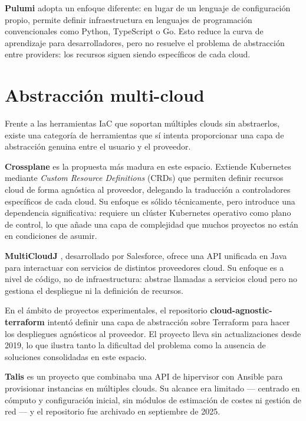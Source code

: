 \textbf{Pulumi} \cite{pulumiDocs} adopta un enfoque diferente: en lugar de un
lenguaje de configuración propio, permite definir infraestructura en lenguajes de
programación convencionales como Python, TypeScript o Go. Esto reduce la curva de
aprendizaje para desarrolladores, pero no resuelve el problema de abstracción
entre providers: los recursos siguen siendo específicos de cada cloud.

\section{Abstracción multi-cloud}

Frente a las herramientas IaC que soportan múltiples clouds sin abstraerlos,
existe una categoría de herramientas que sí intenta proporcionar una capa de
abstracción genuina entre el usuario y el proveedor.

\textbf{Crossplane} \cite{crossplaneDocs} es la propuesta más madura en este
espacio. Extiende Kubernetes mediante \textit{Custom Resource Definitions} (CRDs)
que permiten definir recursos cloud de forma agnóstica al proveedor, delegando
la traducción a controladores específicos de cada cloud. Su enfoque es sólido
técnicamente, pero introduce una dependencia significativa: requiere un clúster
Kubernetes operativo como plano de control, lo que añade una capa de complejidad
que muchos proyectos no están en condiciones de asumir.

\textbf{MultiCloudJ} \cite{multicloudj}, desarrollado por Salesforce, ofrece
una API unificada en Java para interactuar con servicios de distintos proveedores
cloud. Su enfoque es a nivel de código, no de infraestructura: abstrae llamadas
a servicios cloud pero no gestiona el despliegue ni la definición de recursos.

En el ámbito de proyectos experimentales, el repositorio
\textbf{cloud-agnostic-terraform} \cite{cloudAgnosticMythRepo} intentó definir
una capa de abstracción sobre Terraform para hacer los despliegues agnósticos al
proveedor. El proyecto lleva sin actualizaciones desde 2019, lo que ilustra tanto
la dificultad del problema como la ausencia de soluciones consolidadas en este
espacio.

\textbf{Talis} \cite{talisDocs} es un proyecto que combinaba una API de
hipervisor con Ansible para provisionar instancias en múltiples clouds. Su
alcance era limitado — centrado en cómputo y configuración inicial, sin módulos
de estimación de costes ni gestión de red — y el repositorio fue archivado en
septiembre de 2025.

